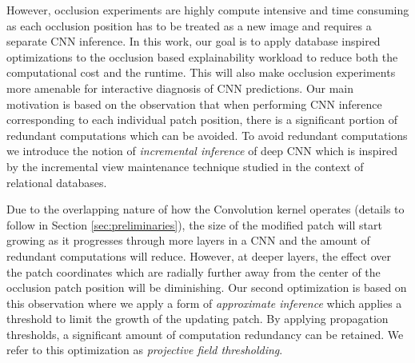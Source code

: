 
However, occlusion experiments are highly compute intensive and time consuming as each occlusion position has to be treated as a new image and requires a separate CNN inference.
In this work, our goal is to apply database inspired optimizations to the occlusion based explainability workload to reduce both the computational cost and the runtime.
This will also make occlusion experiments more amenable for interactive diagnosis of CNN predictions.
Our main motivation is based on the observation that when performing CNN inference corresponding to each individual patch position, there is a significant portion of redundant computations which can be avoided.
To avoid redundant computations we introduce the notion of \textit{incremental inference} of deep CNN which is inspired by the incremental view maintenance technique studied in the context of relational databases.

Due to the overlapping nature of how the Convolution kernel operates (details to follow in Section \ref{sec:preliminaries}), the size of the modified patch will start growing as it progresses through more layers in a CNN and the amount of redundant computations will reduce.
However, at deeper layers, the effect over the patch coordinates which are radially further away from the center of the occlusion patch position will be diminishing.
Our second optimization is based on this observation where we apply a form of \textit{approximate inference} which applies a threshold to limit the growth of the updating patch. 
By applying propagation thresholds, a significant amount of computation redundancy can be retained.
We refer to this optimization as \textit{projective field thresholding}.


